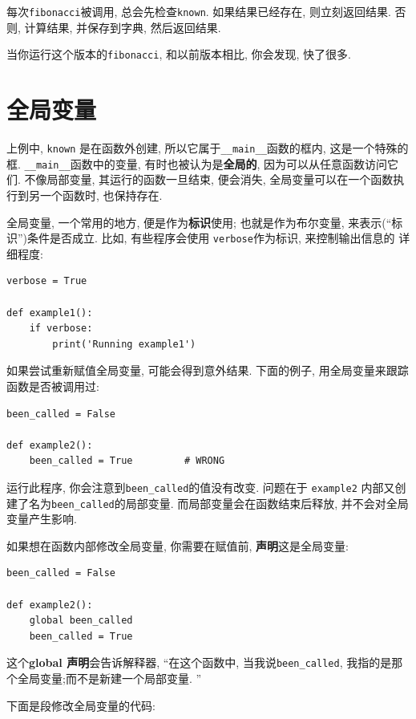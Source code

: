 \documentclass[10pt]{book}
\begin{document}
每次{\tt fibonacci}被调用, 总会先检查{\tt known}. 
如果结果已经存在, 则立刻返回结果. 否则, 计算结果, 
并保存到字典, 然后返回结果. 

当你运行这个版本的{\tt fibonacci}, 和以前版本相比, 
你会发现, 快了很多. 


\section{全局变量}
上例中, {\tt known} 是在函数外创建, 
所以它属于\verb"__main__"函数的框内, 这是一个特殊的框. 
\verb"__main__"函数中的变量, 有时也被认为是{\bf 全局的}, 
因为可以从任意函数访问它们. 
不像局部变量, 其运行的函数一旦结束, 便会消失, 
全局变量可以在一个函数执行到另一个函数时, 也保持存在. 

全局变量, 一个常用的地方, 便是作为{\bf 标识}使用;
也就是作为布尔变量, 来表示(``标识'')条件是否成立. 
比如, 有些程序会使用 {\tt verbose}作为标识, 来控制输出信息的
详细程度:

\begin{verbatim}
verbose = True

def example1():
    if verbose:
        print('Running example1')
\end{verbatim}
%
如果尝试重新赋值全局变量, 可能会得到意外结果. 
下面的例子, 用全局变量来跟踪函数是否被调用过:

\begin{verbatim}
been_called = False

def example2():
    been_called = True         # WRONG
\end{verbatim}
%
运行此程序, 你会注意到\verb"been_called"的值没有改变. 
问题在于 {\tt example2} 内部又创建了名为\verb"been_called"的局部变量. 
而局部变量会在函数结束后释放, 并不会对全局变量产生影响. 

如果想在函数内部修改全局变量, 你需要在赋值前, {\bf 声明}这是全局变量:

\begin{verbatim}
been_called = False

def example2():
    global been_called 
    been_called = True
\end{verbatim}
%
这个{\bf global 声明}会告诉解释器,  ``在这个函数中, 当我说\verb"been_called", 
我指的是那个全局变量;而不是新建一个局部变量. ''

下面是段修改全局变量的代码:
\end{document}

